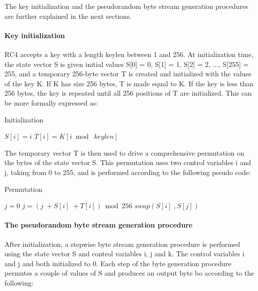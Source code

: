 \documentclass[conference]{IEEEtran}
\begin{document}
The key initialization and the pseudorandom byte stream generation procedures are further explained in the next sections.

\paragraph{Key initialization}

RC4 accepts a key with a length keylen between 1 and 256. At initialization time, the state vector S is given initial values S[0] = 0, S[1] = 1, S[2] = 2, ..., S[255] = 255, and a temporary 256-byte vector T is created and initialized with the values of the key K. If K has size 256 bytes, T is made equal to K. If the key is less than 256 bytes, the key is repeated until all 256 positions of T are initialized. This can be more formally expressed as:

\begin{algorithm}
\caption{Initialization}
\begin{algorithmic} 
\STATE $S[i] = i$
\STATE $T[i] = K[i \bmod\; keylen]$
\ENDFOR
\end{algorithmic}
\end{algorithm}

The temporary vector T is then used to drive a comprehensive permutation on the bytes of the state vector S. This permutation uses two control variables i and j, taking from 0 to 255, and is performed according to the following pseudo code:

\begin{algorithm}
\caption{Permutation}
\begin{algorithmic} 
\STATE $j = 0$
\STATE $j = (j\; + S[i]\; + T[i]) \bmod 256$
\STATE $swap (S[i]\;, S[j])$
\ENDFOR
\end{algorithmic}
\end{algorithm}

\paragraph{The pseudorandom byte stream generation procedure}

After initialization, a stepwise byte stream generation procedure is performed using the state vector S and control variables i, j and k. The control variables i and j and both initialized to 0. Each step of the byte generation procedure permutes a couple of values of S and produces an output byte bo according to the following:
\end{document}
